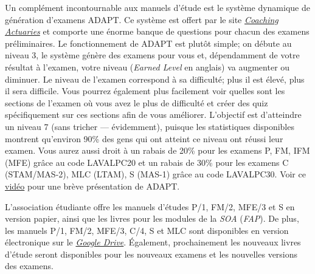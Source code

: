 Un complément incontournable aux manuels d'étude est le système dynamique de génération d'examens ADAPT. Ce système est offert par le site \href{https://www.coachingactuaries.com/}{\emph{Coaching Actuaries}} et comporte une énorme banque de questions pour chacun des examens préliminaires. Le fonctionnement de ADAPT est plutôt simple; on débute au niveau 3, le système génère des examens pour vous et, dépendamment de votre résultat à l'examen, votre niveau (\emph{Earned Level} en anglais) va augmenter ou diminuer. Le niveau de l'examen correspond à sa difficulté; plus il est élevé, plus il sera difficile. Vous pourrez également plus facilement voir quelles sont les sections de l'examen où vous avez le plus de difficulté et créer des quiz spécifiquement sur ces sections afin de vous améliorer. L'objectif est d'atteindre un niveau 7 (sans tricher --- évidemment), puisque les statistiques disponibles montrent qu'environ 90\% des gens qui ont atteint ce niveau ont réussi leur examen. Vous aurez aussi droit à un rabais de 20\% pour les examens P, FM, IFM (MFE) grâce au code LAVALPC20 et un rabais de 30\% pour les examens C (STAM/MAS-2), MLC (LTAM), S (MAS-1) grâce au code LAVALPC30. Voir ce \href{https://www.youtube.com/watch?v=ZBxLa2J5jhs}{vidéo} pour une brève présentation de ADAPT. \vspace{\baselineskip}

L'association étudiante offre les manuels d'études P/1, FM/2, MFE/3 et S en version papier, ainsi que les livres pour les modules de la \textit{SOA} (\textit{FAP}). De plus, les manuels P/1, FM/2, MFE/3, C/4, S et MLC sont disponibles en version électronique sur le \href{https://drive.google.com/open?id=0B6kXivc6X9LISE1ydE41UnY3UDQ}{\textit{Google Drive}}. Également, prochainement les nouveaux livres d'étude seront disponibles pour les nouveaux examens et les nouvelles versions des examens.
\newpage